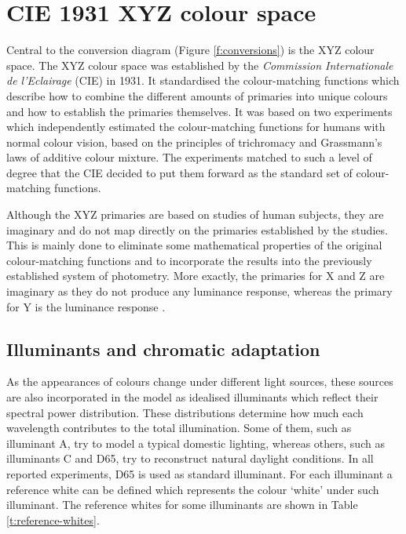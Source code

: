 \section{CIE 1931 XYZ colour space}
\label{s:xyz}

Central to the conversion diagram (Figure \ref{f:conversions}) is the
XYZ colour space. The XYZ colour space was established by the
\emph{Commission Internationale de l'Eclairage} (CIE) in 1931. It standardised
the colour-matching functions which describe how to combine the
different amounts of primaries into unique colours and how to establish
the primaries themselves. It was based on two experiments
\citep{wright28, guild31} which independently estimated the
colour-matching functions for humans with normal colour vision, based
on the principles of trichromacy and Grassmann's laws of additive
colour mixture. The experiments matched to such a level of degree that
the CIE decided to put them forward as the standard set of
colour-matching functions.

Although the XYZ primaries are based on studies of human subjects,
they are imaginary and do not map directly on the primaries
established by the studies. This is mainly done to eliminate some
mathematical properties of the original colour-matching functions and
to incorporate the results into the previously established system of
photometry. More exactly, the primaries for X and Z are imaginary as
they do not produce any luminance response, whereas the primary for Y
is the luminance response \citep{fairchild98color}.

\subsection{Illuminants and chromatic adaptation}

As the appearances of colours change under different light sources,
these sources are also incorporated in the model as idealised
illuminants which reflect their spectral power distribution. These
distributions determine how much each wavelength contributes to the
total illumination. Some of them, such as illuminant A, try to model a
typical domestic lighting, whereas others, such as illuminants C and
D65, try to reconstruct natural daylight conditions. In all reported
experiments, D65 is used as standard illuminant. For each illuminant a
reference white can be defined which represents the colour `white'
under such illuminant. The reference whites for some illuminants are
shown in Table \ref{t:reference-whites}.

